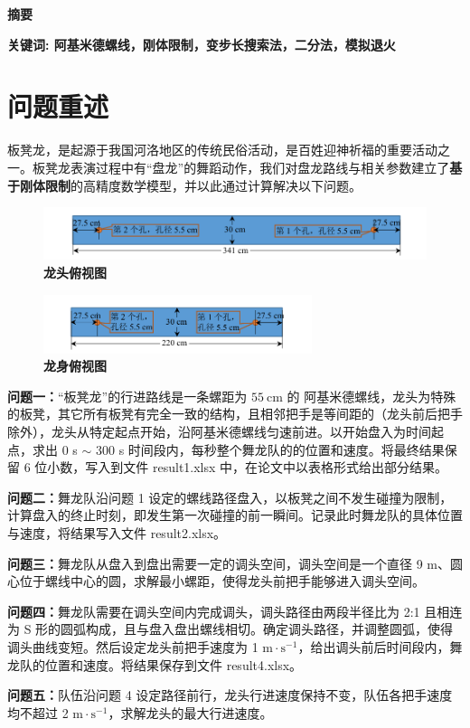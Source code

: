 \documentclass[zihao=-4, UTF8]{article}		%
\theoremstyle{MyLineTheoremStyle} %
\theoremstyle{MyBlockTheoremStyle} %
\theoremstyle{MySubsubsectionStyle} %
\newcommand{\cnabstractname}{\large 摘要}
\newenvironment{cnabstract}{%
        \par
        \noindent\mbox{}\hfill{\bfseries \cnabstractname}\hfill\mbox{}\par
        }{\par}
\begin{document}
\begin{cnabstract}
{        \par
    }\par
    \vspace{12pt}
    {\normalsize \textbf{关键词: 阿基米德螺线，刚体限制，变步长搜索法，二分法，模拟退火}}
\end{cnabstract}
\setlength{\parindent}{2em}

\newpage
\section{问题重述}

板凳龙，是起源于我国河洛地区的传统民俗活动，是百姓迎神祈福的重要活动之一。板凳龙表演过程中有“盘龙”的舞蹈动作，我们对盘龙路线与相关参数建立了\textbf{基于刚体限制}的高精度数学模型，并以此通过计算解决以下问题。\par
\begin{figure}[H]\centering
\includegraphics[width=\textwidth]{assets/dragonhead.pdf}
\caption{\bfseries 龙头俯视图}\label{龙头俯视图}
\end{figure}
\begin{figure}[H]\centering
\includegraphics[width=0.7\textwidth]{assets/dragonbody.pdf}
\caption{\bfseries 龙身俯视图}\label{龙身俯视图}
\end{figure}
\textbf{问题一：}“板凳龙”的行进路线是一条螺距为 $55\ \mathrm{cm}$ 的 阿基米德螺线，龙头为特殊的板凳，其它所有板凳有完全一致的结构，且相邻把手是等间距的（龙头前后把手除外），龙头从特定起点开始，沿阿基米德螺线匀速前进。以开始盘入为时间起点，求出 0 s $\sim$ 300 s 时间段内，每秒整个舞龙队的的位置和速度。将最终结果保留 6 位小数，写入到文件 result1.xlsx 中，在论文中以表格形式给出部分结果。\par
\textbf{问题二：}舞龙队沿问题 1 设定的螺线路径盘入，以板凳之间不发生碰撞为限制，计算盘入的终止时刻，即发生第一次碰撞的前一瞬间。记录此时舞龙队的具体位置与速度，将结果写入文件 result2.xlsx。\par
\textbf{问题三：}舞龙队从盘入到盘出需要一定的调头空间，调头空间是一个直径 9 m、圆心位于螺线中心的圆，求解最小螺距，使得龙头前把手能够进入调头空间。\par
\textbf{问题四：}舞龙队需要在调头空间内完成调头，调头路径由两段半径比为 2:1 且相连为 S 形的圆弧构成，且与盘入盘出螺线相切。确定调头路径，并调整圆弧，使得调头曲线变短。然后设定龙头前把手速度为 1 $\mathrm{m\cdot s^{-1}}$，给出调头前后时间段内，舞龙队的位置和速度。将结果保存到文件 result4.xlsx。\par
\textbf{问题五：}队伍沿问题 4 设定路径前行，龙头行进速度保持不变，队伍各把手速度均不超过 2 $\mathrm{m\cdot s^{-1}}$，求解龙头的最大行进速度。
\end{document}
